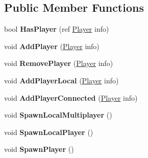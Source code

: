 \subsection*{Public Member Functions}
\begin{DoxyCompactItemize}
\item 
\hypertarget{class_game_state_a05acc40696378ba026165a2cc824acf0}{bool {\bfseries Has\-Player} (ref \hyperlink{struct_game_state_1_1_player}{Player} info)}\label{class_game_state_a05acc40696378ba026165a2cc824acf0}

\item 
\hypertarget{class_game_state_a4c4e32237639764263332c7c236974d1}{void {\bfseries Add\-Player} (\hyperlink{struct_game_state_1_1_player}{Player} info)}\label{class_game_state_a4c4e32237639764263332c7c236974d1}

\item 
\hypertarget{class_game_state_ae8d21ce826daada0dabeadd11c6eb233}{void {\bfseries Remove\-Player} (\hyperlink{struct_game_state_1_1_player}{Player} info)}\label{class_game_state_ae8d21ce826daada0dabeadd11c6eb233}

\item 
\hypertarget{class_game_state_a1e3c3340e55693af1c8326879a81f1c4}{void {\bfseries Add\-Player\-Local} (\hyperlink{struct_game_state_1_1_player}{Player} info)}\label{class_game_state_a1e3c3340e55693af1c8326879a81f1c4}

\item 
\hypertarget{class_game_state_a2e6cdef311e93ec46d07206d621f6837}{void {\bfseries Add\-Player\-Connected} (\hyperlink{struct_game_state_1_1_player}{Player} info)}\label{class_game_state_a2e6cdef311e93ec46d07206d621f6837}

\item 
\hypertarget{class_game_state_a61e4817740bd283ce4a6ea44e0d0f00a}{void {\bfseries Spawn\-Local\-Multiplayer} ()}\label{class_game_state_a61e4817740bd283ce4a6ea44e0d0f00a}

\item 
\hypertarget{class_game_state_a82b88c45043a403441d3eef1e0b72266}{void {\bfseries Spawn\-Local\-Player} ()}\label{class_game_state_a82b88c45043a403441d3eef1e0b72266}

\item 
\hypertarget{class_game_state_af2fbb55979f8cc6da50317e1d701e370}{void {\bfseries Spawn\-Player} ()}\label{class_game_state_af2fbb55979f8cc6da50317e1d701e370}


\end{DoxyCompactItemize}
